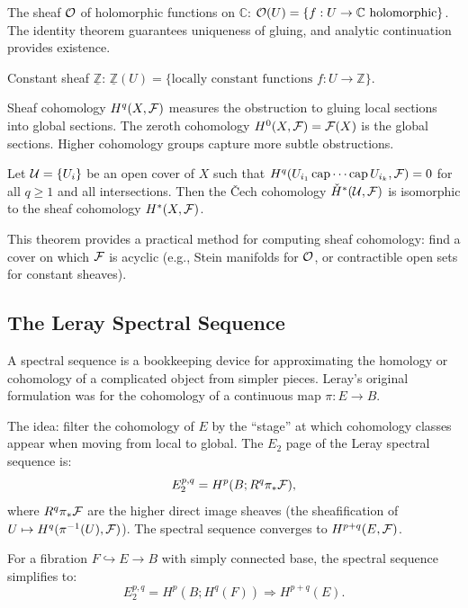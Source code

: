 \begin{example}
The sheaf $\mathcal{O}$ of holomorphic functions on $\mathbb{C}$: $\mathcal{O}(U) = \{f: U \to \mathbb{C} \text{ holomorphic}\}$. The identity theorem guarantees uniqueness of gluing, and analytic continuation provides existence.
\end{example}

\begin{example}
Constant sheaf $\underline{\mathbb{Z}}$: $\underline{\mathbb{Z}}(U) = \{ \text{locally constant functions } f: U \to \mathbb{Z}\}$.
\end{example}

Sheaf cohomology $H^q(X, \mathcal{F})$ measures the obstruction to gluing local sections into global sections. The zeroth cohomology $H^0(X, \mathcal{F}) = \mathcal{F}(X)$ is the global sections. Higher cohomology groups capture more subtle obstructions.

\begin{theorem}
Let $\mathcal{U} = \{U_i\}$ be an open cover of $X$ such that $H^q(U_{i_1} \operatorname{\mathrm{cap}} \cdots \operatorname{\mathrm{cap}} U_{i_k}, \mathcal{F}) = 0$ for all $q \geq 1$ and all intersections. Then the \v{C}ech cohomology $\check{H}^*(\mathcal{U}, \mathcal{F})$ is isomorphic to the sheaf cohomology $H^*(X, \mathcal{F})$.
\end{theorem}

This theorem provides a practical method for computing sheaf cohomology: find a cover on which $\mathcal{F}$ is acyclic (e.g., Stein manifolds for $\mathcal{O}$, or contractible open sets for constant sheaves).

\subsection{The Leray Spectral Sequence}

A spectral sequence is a bookkeeping device for approximating the homology or cohomology of a complicated object from simpler pieces. Leray's original formulation was for the cohomology of a continuous map $\pi: E \to B$.

The idea: filter the cohomology of $E$ by the ``stage'' at which cohomology classes appear when moving from local to global. The $E_2$ page of the Leray spectral sequence is:
\[
E_2^{p,q} = H^p(B; R^q \pi_* \mathcal{F}),
\]
where $R^q \pi_* \mathcal{F}$ are the higher direct image sheaves (the sheafification of $U \mapsto H^q(\pi^{-1}(U), \mathcal{F})$). The spectral sequence converges to $H^{p+q}(E, \mathcal{F})$.

For a fibration $F \hookrightarrow E \to B$ with simply connected base, the spectral sequence simplifies to:
\[
E_2^{p,q} = H^p(B; H^q(F)) \Longrightarrow H^{p+q}(E).
\]

